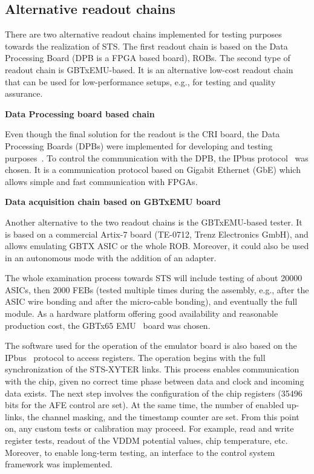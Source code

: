 \newpage
\subsection{Alternative readout chains}
\label{tester}
There are two alternative readout chains implemented for testing purposes towards the realization of \gls{STS}. The first readout chain is based on the Data Processing Board (\gls{DPB} is a \gls{FPGA} based board), \glspl{ROB}. The second type of readout chain is GBTxEMU-based. It is an alternative low-cost readout chain that can be used for
low-performance setups, e.g., for testing and quality assurance. \bigbreak


\textbf{Data Processing board based chain}\bigbreak


Even though the final solution for the readout is the \gls{CRI} board, the Data Processing Boards (\glspl{DPB}) were implemented for developing and testing purposes~\cite{Loizeau}. To control the communication with the \gls{DPB}, the IPbus protocol~\cite{ipbus} was chosen. It is a communication protocol based on Gigabit Ethernet (GbE) which allows simple and fast communication with \glspl{FPGA}.\bigbreak


\textbf{Data acquisition chain based on GBTxEMU board} \bigbreak


Another alternative to the two readout chains is the GBTxEMU-based tester. It is based on a commercial Artix-7 board (TE-0712, Trenz Electronics GmbH), and allows emulating GBTX ASIC or the whole \gls{ROB}. Moreover, it could also be used in an autonomous mode with the addition of an adapter.


The whole examination process towards \gls{STS} will include testing of about 20000 \glspl{ASIC}, then 2000 \glspl{FEB} (tested  multiple times during the assembly, e.g., after the \gls{ASIC} wire bonding and after the micro-cable bonding), and eventually the full module. As a hardware platform offering good availability and reasonable production cost, the GBTx65 EMU~\cite{zabolotny1} board was chosen.

The software used for the operation of the emulator board is also based on the IPbus~\cite{ipbus} protocol to access registers.
The operation begins with the full synchronization of the STS-XYTER links. This process enables communication with the chip, given no correct time phase between data and clock and incoming data exists. The next step involves the configuration of the chip registers (35496 bits for the AFE control are set). At the same time, the number of enabled up-links, the channel masking, and the timestamp counter are set.  From this point on, any custom tests or calibration may proceed. For example, read and write register tests, readout of the VDDM potential values, chip temperature, etc. Moreover, to enable long-term testing, an interface to the control system framework was implemented.

